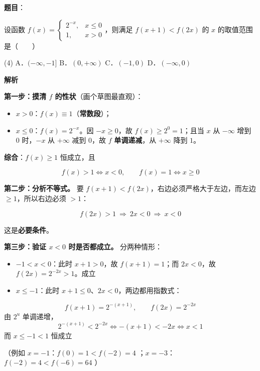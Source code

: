 \begin{answer}

\textbf{题目}：

设函数 $f(x)=\begin{cases}2^{-x},&x\le0\\ 1,&x>0\end{cases}$，则满足 $f(x+1)<f(2x)$ 的 $x$ 的取值范围是\mbox{（　　）}

\begin{gkopts}(4)
\task A．$(-\infty,-1]$
\task B．$(0,+\infty)$
\task C．$(-1,0)$
\task D．$(-\infty,0)$
\end{gkopts}

\textbf{解析}

\textbf{第一步：摸清 $f$ 的性状}（画个草图最直观）：

\begin{itemize}
\item $x>0$：$f(x)\equiv1$（\textbf{常数段}）；
\item $x\le0$：$f(x)=2^{-x}$。因 $-x\ge0$，故 $f(x)\ge2^{0}=1$；且当 $x$ 从 $-\infty$ 增到 $0$ 时，$-x$ 从 $+\infty$ 减到 $0$，故 $f$ \textbf{单调递减}，从 $+\infty$ 降到 $1$。
\end{itemize}

\textbf{综合}：$f(x)\ge1$ 恒成立，且

\nopagebreak[4]
\[f(x)>1\iff x<0,\qquad f(x)=1\iff x\ge0\]

\textbf{第二步：分析不等式。} 要 $f(x+1)<f(2x)$，右边必须严格大于左边，而左边 $\ge1$，所以右边必须 $>1$：

\nopagebreak[4]
\[f(2x)>1\ \Longrightarrow\ 2x<0\ \Longrightarrow\ x<0\]

这是\textbf{必要条件}。

\textbf{第三步：验证 $x<0$ 时是否都成立。} 分两种情形：

\begin{itemize}
\item \textbf{$-1<x<0$}：此时 $x+1>0$，故 $f(x+1)=1$；而 $2x<0$，故 $f(2x)=2^{-2x}>1$。成立 
\item \textbf{$x\le-1$}：此时 $x+1\le0$、$2x<0$，两边都用指数式：
\end{itemize}
\nopagebreak[4]
\[f(x+1)=2^{-(x+1)},\qquad f(2x)=2^{-2x}\]
  由 $2^{u}$ 单调递增，
\nopagebreak[4]
\[2^{-(x+1)}<2^{-2x}\iff-(x+1)<-2x\iff x<1\]
  而 $x\le-1<1$ 恒成立 

（例如 $x=-1$：$f(0)=1<f(-2)=4$ ；$x=-3$：$f(-2)=4<f(-6)=64$ ）


\end{answer}
